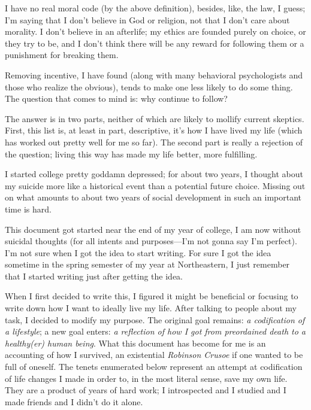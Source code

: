 \documentclass[./butidigress.tex]{subfiles}
\begin{document}
I have no real moral code (by the above definition), besides, like, the law, I guess; I'm saying that I don't believe in God or religion, not that I don't care about morality.
I don't believe in an afterlife; my ethics are founded purely on choice, or they try to be, and I don't think there will be any reward for following them or a punishment for breaking them.

Removing incentive, I have found (along with many behavioral psychologists and those who realize the obvious), tends to make one less likely to do some thing.
The question that comes to mind is: why continue to follow?

The answer is in two parts, neither of which are likely to mollify current skeptics.
First, this list is, at least in part, descriptive, it's how I have lived my life (which has worked out pretty well for me so far).
The second part is really a rejection of the question; living this way has made my life better, more fulfilling.

\label{sec:development}
I started college pretty goddamn depressed; for about two years, I thought about my suicide more like a historical event than a potential future choice.
Missing out on what amounts to about two years of social development in such an important time is hard.

This document got started near the end of my  year of college, I am now without suicidal thoughts (for all intents and purposes---I'm not gonna say I'm perfect).
I'm not sure when I got the idea to start writing.
For sure I got the idea sometime in the spring semester of my  year at Northeastern, I just remember that I started writing just after getting the idea.

When I first decided to write this, I figured it might be beneficial or focusing to write down how I want to ideally live my life.
After talking to people about my task, I decided to modify my purpose.
The original goal remains: \emph{a codification of a lifestyle}; a new goal enters: \emph{a reflection of how I got from preordained death to a healthy(er) human being}.
What this document has become for me is an accounting of how I survived, an existential \textit{Robinson Crusoe} if one wanted to be full of oneself.
The tenets enumerated below represent an attempt at codification of life changes I made in order to, in the most literal sense, save my own life.
They are a product of years of hard work; I introspected and I studied and I made friends and I didn't do it alone.
\end{document}
